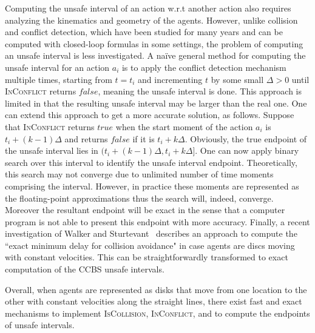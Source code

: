 \documentclass[review]{elsarticle}
\newcommand\konstantin[1]{\nb{\textbf{Konstantin:}}{red}{#1}}
\newcommand\roni[1]{\nb{\textbf{Roni:}}{green}{#1}}
\newcommand{\ccbs}{\ac{CCBS}\xspace}
\newcommand{\iscollision}{\textsc{IsCollision}\xspace}
\newcommand{\inconflict}{\textsc{InConflict}\xspace}
\begin{document}
Computing the unsafe interval of an action w.r.t another action also requires analyzing the kinematics and geometry of the agents. However, unlike collision and conflict detection, which have been studied for many years and can be computed with closed-loop formulas in some settings, the problem of computing an unsafe interval is less investigated.  %
A na\"ive general method for computing the unsafe interval for an action $a_i$ is to apply the conflict detection mechanism multiple times, starting from $t=t_i$ and incrementing $t$ by some small $\Delta>0$ until  \inconflict returns $false$, meaning the unsafe interval is done. This approach is limited in that the resulting unsafe interval may be larger than the real one. One can extend this approach to get a more accurate solution, as follows. Suppose that \inconflict returns $true$ when the start moment of the action $a_i$ is $t_i + (k-1)\Delta$ and returns $false$ if it is $t_i + k\Delta$. Obviously, the true endpoint of the unsafe interval lies in $(t_i + (k-1)\Delta, t_i + k\Delta]$. One can now apply binary search over this interval to identify the unsafe interval endpoint. Theoretically, this search may not converge due to unlimited number of time moments comprising the interval. However, in practice these moments are represented as the floating-point approximations thus the search will, indeed, converge. Moreover the resultant endpoint will be exact in the sense that a computer program is not able to present this endpoint with more accuracy. Finally, a recent investigation of Walker and Sturtevant~\cite{walker2019collision} describes an approach to compute the ``exact minimum delay for collision avoidance" in case agents are discs moving with constant velocities. This can be straightforwardly transformed to exact computation of the \ccbs unsafe intervals.

Overall, when agents are represented as disks that move from one location to the other with constant velocities along the straight lines, there exist fast and exact mechanisms to implement \iscollision, \inconflict, and to compute the endpoints of unsafe intervals. 


\end{document}
